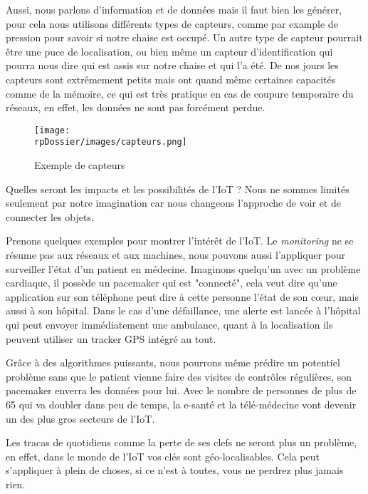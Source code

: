 Aussi, nous parlons d'information et de données mais il faut bien les générer, pour cela nous utilisons différents types de capteurs, comme par example de pression pour savoir si notre chaise est occupé. Un autre type de capteur pourrait être une puce de localisation, ou bien même un capteur d'identification qui pourra nous dire qui est assis sur notre chaise et qui l'a été. De nos jours les capteurs sont extrêmement petits mais ont quand même certaines capacités comme de la mémoire, ce qui est très pratique en cas de coupure temporaire du réseaux, en effet, les données ne sont pas forcément perdue.

\begin{figure}[H]
\begin{center}
\texttt{[image: \\rpDossier/images/capteurs.png]}
\end{center}
\caption{Exemple de capteurs}
\label{sensors}
\end{figure}

Quelles seront les impacts et les possibilités de l'IoT ? Nous ne sommes limités seulement par notre imagination car nous changeons l'approche de voir et de connecter les objets.


Prenons quelques exemples pour montrer l'intérêt de l'IoT. Le \textit{monitoring} ne se résume pas aux réseaux et aux machines, nous pouvons aussi l'appliquer pour surveiller l'état d'un patient en médecine. Imaginons quelqu'un avec un problème cardiaque, il possède un pacemaker qui est "connecté", cela veut dire qu'une application sur son téléphone peut dire à cette personne l'état de son cœur, mais aussi à son hôpital. Dans le cas d'une défaillance, une alerte est lancée à l'hôpital qui peut envoyer immédiatement une ambulance, quant à la localisation ils peuvent utiliser un tracker GPS intégré au tout.

Grâce à des algorithmes puissants, nous pourrons même prédire un potentiel problème sans que le patient vienne faire des visites de contrôles régulières, son pacemaker enverra les données pour lui. Avec le nombre de personnes de plus de 65 qui va doubler dans peu de temps, la e-santé et la télé-médecine vont devenir un des plus gros secteurs de l'IoT. 


Les tracas de quotidiens comme la perte de ses clefs ne seront plus un problème, en effet, dans le monde de l'IoT vos clés sont géo-localisables. Cela peut s'appliquer à plein de choses, si ce n'est à toutes, vous ne perdrez plus jamais rien.

